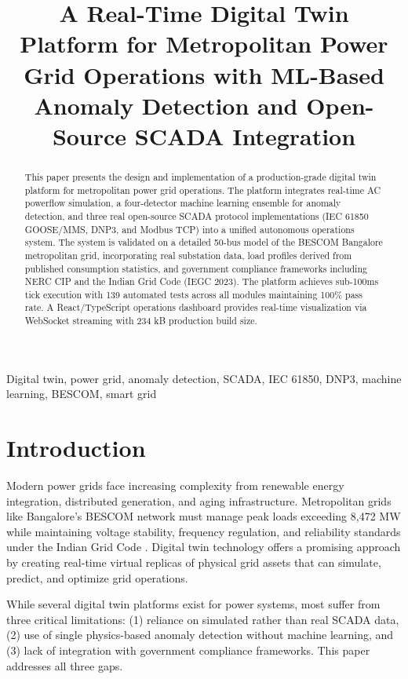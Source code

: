 \documentclass[conference]{IEEEtran}
\title{A Real-Time Digital Twin Platform for Metropolitan Power Grid Operations with ML-Based Anomaly Detection and Open-Source SCADA Integration}
\author{
\IEEEauthorblockN{Varshini C B}
\IEEEauthorblockA{Department of Electrical Engineering\\
Bangalore, India\\
varshinicb@example.com}
}
\begin{document}
\maketitle

\begin{abstract}
This paper presents the design and implementation of a production-grade digital twin platform for metropolitan power grid operations. The platform integrates real-time AC powerflow simulation, a four-detector machine learning ensemble for anomaly detection, and three real open-source SCADA protocol implementations (IEC 61850 GOOSE/MMS, DNP3, and Modbus TCP) into a unified autonomous operations system. The system is validated on a detailed 50-bus model of the BESCOM Bangalore metropolitan grid, incorporating real substation data, load profiles derived from published consumption statistics, and government compliance frameworks including NERC CIP and the Indian Grid Code (IEGC 2023). The platform achieves sub-100ms tick execution with 139 automated tests across all modules maintaining 100\% pass rate. A React/TypeScript operations dashboard provides real-time visualization via WebSocket streaming with 234 kB production build size.
\end{abstract}

\begin{IEEEkeywords}
Digital twin, power grid, anomaly detection, SCADA, IEC 61850, DNP3, machine learning, BESCOM, smart grid
\end{IEEEkeywords}

\section{Introduction}

Modern power grids face increasing complexity from renewable energy integration, distributed generation, and aging infrastructure. Metropolitan grids like Bangalore's BESCOM network must manage peak loads exceeding 8,472 MW while maintaining voltage stability, frequency regulation, and reliability standards under the Indian Grid Code \cite{iegc2023}. Digital twin technology offers a promising approach by creating real-time virtual replicas of physical grid assets that can simulate, predict, and optimize grid operations.

While several digital twin platforms exist for power systems, most suffer from three critical limitations: (1) reliance on simulated rather than real SCADA data, (2) use of single physics-based anomaly detection without machine learning, and (3) lack of integration with government compliance frameworks. This paper addresses all three gaps.
\end{document}
